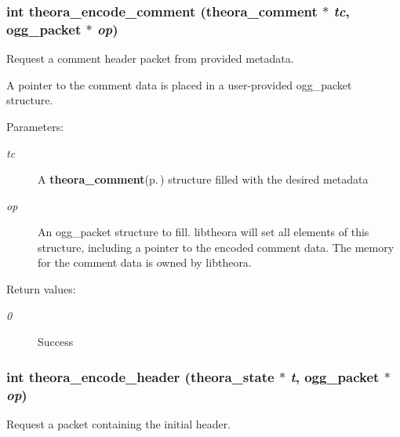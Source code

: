 \subsubsection{\setlength{\rightskip}{0pt plus 5cm}int theora\_\-encode\_\-comment ({\bf theora\_\-comment} $\ast$ {\em tc}, ogg\_\-packet $\ast$ {\em op})}\label{theora_8h_db11c4000d2a049167ea1d0a6aa12194}


Request a comment header packet from provided metadata. 

A pointer to the comment data is placed in a user-provided ogg\_\-packet structure. \begin{Desc}
\item[Parameters:]
\begin{description}
\item[{\em tc}]A {\bf theora\_\-comment}{\rm (p.\,\pageref{structtheora__comment})} structure filled with the desired metadata \item[{\em op}]An ogg\_\-packet structure to fill. libtheora will set all elements of this structure, including a pointer to the encoded comment data. The memory for the comment data is owned by libtheora. \end{description}
\end{Desc}
\begin{Desc}
\item[Return values:]
\begin{description}
\item[{\em 0}]Success \end{description}
\end{Desc}
\subsubsection{\setlength{\rightskip}{0pt plus 5cm}int theora\_\-encode\_\-header ({\bf theora\_\-state} $\ast$ {\em t}, ogg\_\-packet $\ast$ {\em op})}\label{theora_8h_4f9e6ef696ec209d14749177edde69f4}


Request a packet containing the initial header. 

